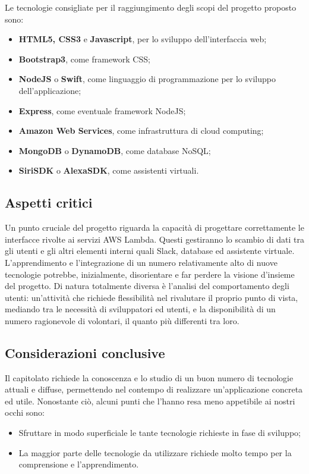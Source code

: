 Le tecnologie consigliate per il raggiungimento degli scopi del progetto proposto sono:
\begin{itemize}
	\item \textbf{HTML5, CSS3} e \textbf{Javascript}, per lo sviluppo dell'interfaccia web;
	\item \textbf{Bootstrap3}, come framework CSS;
	\item \textbf{NodeJS} o \textbf{Swift}, come linguaggio di programmazione per lo
	sviluppo dell'applicazione;
	\item \textbf{Express}, come eventuale framework NodeJS;
	\item \textbf{Amazon Web Services}, come infrastruttura di cloud computing;
	\item \textbf{MongoDB} o \textbf{DynamoDB}, come database NoSQL;
	\item \textbf{SiriSDK} o \textbf{AlexaSDK}, come assistenti virtuali.
\end{itemize}

\subsection{Aspetti critici}

Un punto cruciale del progetto riguarda la capacità di progettare
correttamente le interfacce rivolte ai servizi AWS Lambda. Questi
gestiranno lo scambio di dati tra gli utenti e gli altri elementi
interni quali Slack, database ed assistente virtuale. L'apprendimento e l'integrazione di un numero relativamente alto di nuove tecnologie potrebbe, inizialmente, disorientare e far perdere la visione d'insieme del progetto.
Di natura totalmente diversa è l'analisi del comportamento degli
utenti: un'attività che richiede flessibilità nel rivalutare il proprio
punto di vista, mediando tra le necessità di sviluppatori ed utenti,
e la disponibilità di un numero ragionevole di volontari, il quanto più differenti tra loro.

\subsection{Considerazioni conclusive}

Il capitolato richiede la conoscenza e lo studio di un buon numero di tecnologie attuali e diffuse, permettendo nel contempo di realizzare un'applicazione concreta ed utile. Nonostante ciò, alcuni punti che l'hanno resa meno appetibile ai nostri occhi sono:
\begin{itemize}
	\item Sfruttare in modo superficiale le tante tecnologie richieste in fase di sviluppo;
	\item La maggior parte delle tecnologie da utilizzare richiede molto tempo per la comprensione e l'apprendimento.
\end{itemize}


